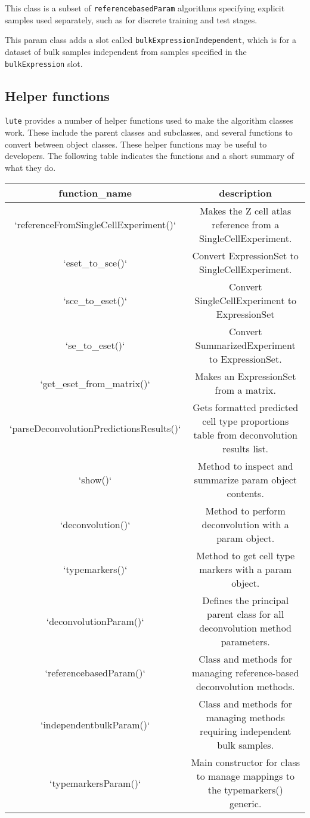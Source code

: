 \documentclass[]{article}
\begin{document}
This class is a subset of \texttt{referencebasedParam} algorithms specifying explicit
samples used separately, such as for discrete training and test stages.

This param class adds a slot called \texttt{bulkExpressionIndependent}, which is for a
dataset of bulk samples independent from samples specified in the
\texttt{bulkExpression} slot.

\hypertarget{helper-functions}{%
\subsection{Helper functions}\label{helper-functions}}

\texttt{lute} provides a number of helper functions used to make the algorithm classes
work. These include the parent classes and subclasses, and several functions to
convert between object classes. These helper functions may be useful to
developers. The following table indicates the functions and a short summary of
what they do.

\begin{tabular}{c|c}
\hline
function\_name & description\\
\hline
`referenceFromSingleCellExperiment()` & Makes the Z cell atlas reference from a SingleCellExperiment.\\
\hline
`eset\_to\_sce()` & Convert ExpressionSet to SingleCellExperiment.\\
\hline
`sce\_to\_eset()` & Convert SingleCellExperiment to ExpressionSet\\
\hline
`se\_to\_eset()` & Convert SummarizedExperiment to ExpressionSet.\\
\hline
`get\_eset\_from\_matrix()` & Makes an ExpressionSet from a matrix.\\
\hline
`parseDeconvolutionPredictionsResults()` & Gets formatted predicted cell type proportions table from deconvolution results list.\\
\hline
`show()` & Method to inspect and summarize param object contents.\\
\hline
`deconvolution()` & Method to perform deconvolution with a param object.\\
\hline
`typemarkers()` & Method to get cell type markers with a param object.\\
\hline
`deconvolutionParam()` & Defines the principal parent class for all deconvolution method parameters.\\
\hline
`referencebasedParam()` & Class and methods for managing reference-based deconvolution methods.\\
\hline
`independentbulkParam()` & Class and methods for managing methods requiring independent bulk samples.\\
\hline
`typemarkersParam()` & Main constructor for class to manage mappings to the typemarkers() generic.\\
\hline
\end{tabular}
\end{document}
